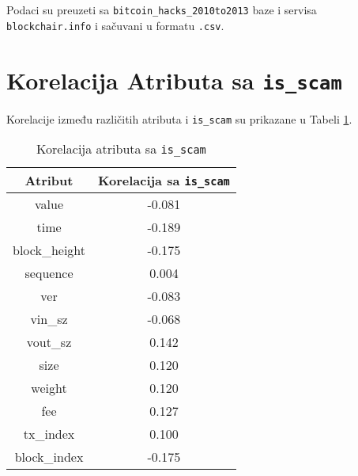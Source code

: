 \documentclass{article}
\begin{document}
Podaci su preuzeti sa \texttt{bitcoin\_hacks\_2010to2013} baze i servisa \texttt{blockchair.info} i sačuvani u formatu \texttt{.csv}.

\section{Korelacija Atributa sa \texttt{is\_scam}}
Korelacije između različitih atributa i \texttt{is\_scam} su prikazane u Tabeli \ref{tab:correlation}.

\begin{table}[h!]
    \centering
    \begin{tabular}{|c|c|}
        \hline
        \textbf{Atribut} & \textbf{Korelacija sa \texttt{is\_scam}} \\
        \hline
        value & -0.081 \\
        time & -0.189 \\
        block\_height & -0.175 \\
        sequence & 0.004 \\
        ver & -0.083 \\
        vin\_sz & -0.068 \\
        vout\_sz & 0.142 \\
        size & 0.120 \\
        weight & 0.120 \\
        fee & 0.127 \\
        tx\_index & 0.100 \\
        block\_index & -0.175 \\
        \hline
    \end{tabular}
    \caption{Korelacija atributa sa \texttt{is\_scam}}
    \label{tab:correlation}
\end{table}
\end{document}
